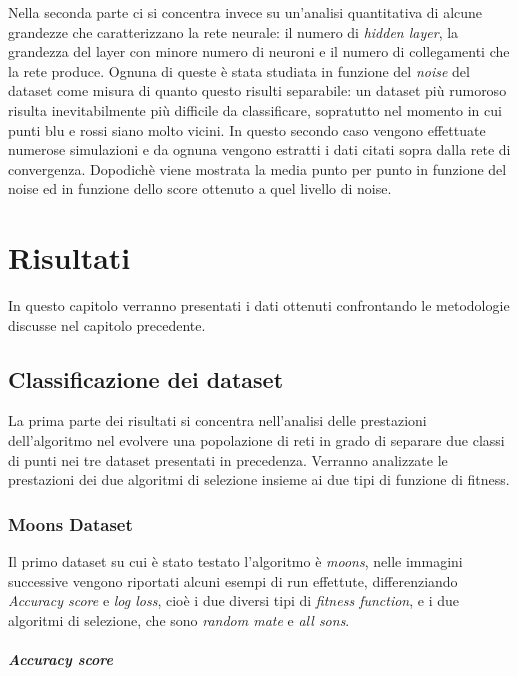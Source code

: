 \documentclass[12pt,a4paper]{report}
\begin{document}
Nella seconda parte ci si concentra invece su un'analisi quantitativa di alcune grandezze che caratterizzano la rete neurale: il numero di \textit{hidden layer}, la grandezza del layer con minore numero di neuroni e il numero di collegamenti che la rete produce.
Ognuna di queste è stata studiata in funzione del \textit{noise} del dataset come misura di quanto questo risulti separabile: un dataset più rumoroso risulta inevitabilmente più difficile da classificare, sopratutto nel momento in cui punti blu e rossi siano molto vicini.
In questo secondo caso vengono effettuate numerose simulazioni e da ognuna vengono estratti i dati citati sopra dalla rete di convergenza.
Dopodichè viene mostrata la media punto per punto in funzione del noise ed in funzione dello score ottenuto a quel livello di noise.

\chapter{Risultati}

In questo capitolo verranno presentati i dati ottenuti confrontando le  metodologie discusse nel capitolo precedente.

\section{Classificazione dei dataset}

La prima parte dei risultati si concentra nell'analisi delle prestazioni dell'algoritmo nel evolvere una popolazione di reti in grado di separare due classi di punti nei tre dataset presentati in precedenza. Verranno analizzate le prestazioni dei due algoritmi di selezione insieme ai due tipi di funzione di fitness.

\subsection{Moons Dataset}

Il primo dataset su cui è stato testato l'algoritmo è \textit{moons}, nelle immagini successive vengono riportati alcuni esempi di run effettute, differenziando \textit{Accuracy score} e \textit{log loss}, cioè i due diversi tipi di \textit{fitness function}, e i due algoritmi di selezione, che sono \textit{random mate} e \textit{all sons}.
 
\paragraph{Accuracy score}
 
\end{document}
